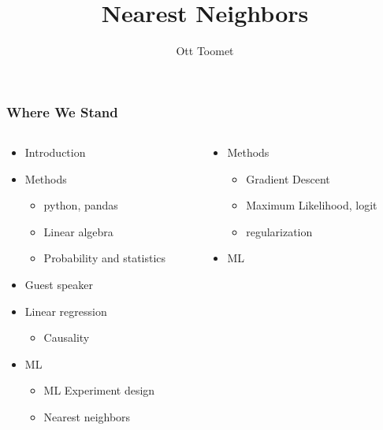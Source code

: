\documentclass[mathserif, xcolor=table, svgnames]{beamer}
\title{Nearest Neighbors}
\author{Ott Toomet}
\begin{document}
\lstset{language=Python}

\begin{frame}
  \maketitle
\end{frame}

\begin{frame}
  \tableofcontents
\end{frame}

\begin{frame}
\frametitle{Where We Stand}
\begin{columns}
  \begin{column}{0.5\linewidth}
    \begin{itemize}
    \item Introduction
    \item Methods
      \begin{itemize}
      \item python, pandas
      \item Linear algebra
      \item Probability and statistics
      \end{itemize}
    \item Guest speaker
    \item Linear regression
      \begin{itemize}
      \item Causality
      \end{itemize}
    \item ML
      \begin{itemize}
      \item ML Experiment design
      \item \alert{Nearest neighbors}
      \end{itemize}
    \end{itemize}
  \end{column}
  \begin{column}{0.5\linewidth}
    \begin{itemize}
    \item Methods
      \begin{itemize}
      \item Gradient Descent 
      \item Maximum Likelihood, logit
      \item regularization
      \end{itemize}
    \item ML

\end{itemize}
\end{column}
\end{columns}
\end{frame}
\end{document}
